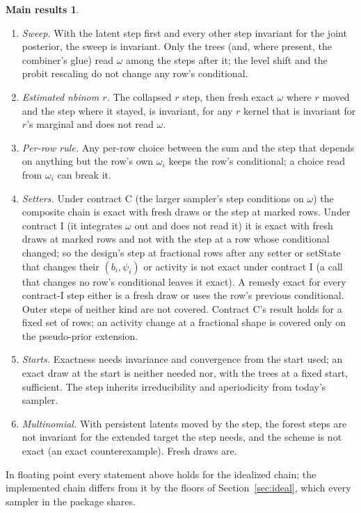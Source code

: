 \documentclass[11pt]{article}
\theoremstyle{definition}
\newtheorem*{mainthm}{Main results}
\begin{document}
\begin{mainthm}
\begin{enumerate}[label=\textbf{T\arabic*.},leftmargin=2.2em]
Section~\ref{sec:dens}.
\item \emph{Sweep.} With the latent step first and every other step invariant for the joint posterior, the sweep
is invariant. Only the trees (and, where present, the combiner's glue) read $\omega$ among the steps after it;
the level shift and the probit rescaling do not change any row's conditional.
\item \emph{Estimated nbinom $r$.} The collapsed $r$ step, then fresh exact $\omega$ where $r$ moved and the step
where it stayed, is invariant, for any $r$ kernel that is invariant for $r$'s marginal and does not read
$\omega$.
\item \emph{Per-row rule.} Any per-row choice between the sum and the step that depends on anything but the row's
own $\omega_i$ keeps the row's conditional; a choice read from $\omega_i$ can break it.
\item \emph{Setters.} Under contract C (the larger sampler's step conditions on $\omega$) the composite chain is
exact with fresh draws or the step at marked rows. Under contract I (it integrates $\omega$ out and does not read
it) it is exact with fresh draws at marked rows and not with the step at a row whose conditional changed; so the
design's step at fractional rows after any setter or setState that changes their $(b_i,\psi_i)$ or activity is not
exact under contract I (a call that changes no row's conditional leaves it exact). A remedy exact for every contract-I step either is a
fresh draw or uses the row's previous conditional. Outer steps of neither kind are not covered. Contract C's
result holds for a fixed set of rows; an activity change at a fractional shape is covered only on the pseudo-prior
extension.
\item \emph{Starts.} Exactness needs invariance and convergence from the start used; an exact draw at the start
is neither needed nor, with the trees at a fixed start, sufficient. The step inherits irreducibility and
aperiodicity from today's sampler.
\item \emph{Multinomial.} With persistent latents moved by the step, the forest steps are not invariant for the
extended target the step needs, and the scheme is not exact (an exact counterexample). Fresh draws are.
\end{enumerate}
In floating point every statement above holds for the idealized chain; the implemented chain differs from it by
the floors of Section~\ref{sec:ideal}, which every sampler in the package shares.
\end{mainthm}
\end{document}
